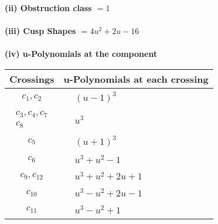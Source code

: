 \documentclass[1p]{elsarticle_modified}
\theoremstyle{definition}
\begin{document}
\flushleft \textbf{(ii) Obstruction class $= 1$}\\~\\
\flushleft \textbf{(iii) Cusp Shapes $= 4 u^2+2 u-16$}\\~\\
\newpage\renewcommand{\arraystretch}{1}
\flushleft \textbf{(iv) u-Polynomials at the component}\newline \\
\begin{tabular}{m{50pt}|m{274pt}}
Crossings & \hspace{64pt}u-Polynomials at each crossing \\
\hline $$\begin{aligned}c_{1},c_{2}\end{aligned}$$&$\begin{aligned}
&(u-1)^3
\end{aligned}$\\
\hline $$\begin{aligned}c_{3},c_{4},c_{7}\\c_{8}\end{aligned}$$&$\begin{aligned}
&u^3
\end{aligned}$\\
\hline $$\begin{aligned}c_{5}\end{aligned}$$&$\begin{aligned}
&(u+1)^3
\end{aligned}$\\
\hline $$\begin{aligned}c_{6}\end{aligned}$$&$\begin{aligned}
&u^3+u^2-1
\end{aligned}$\\
\hline $$\begin{aligned}c_{9},c_{12}\end{aligned}$$&$\begin{aligned}
&u^3+u^2+2 u+1
\end{aligned}$\\
\hline $$\begin{aligned}c_{10}\end{aligned}$$&$\begin{aligned}
&u^3- u^2+2 u-1
\end{aligned}$\\
\hline $$\begin{aligned}c_{11}\end{aligned}$$&$\begin{aligned}
&u^3- u^2+1
\end{aligned}$\\
\hline
\end{tabular}\\~\\
\end{document}
